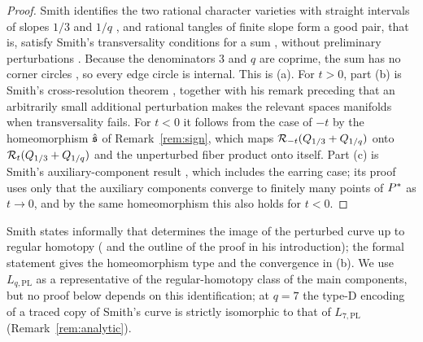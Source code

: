 \begin{proof}
Smith identifies the two rational character varieties with straight intervals of slopes $1/3$ and
$1/q$ \cite[Prop.~2.27]{Smith}, and rational tangles of finite slope form a good pair, that is, satisfy
Smith's transversality conditions for a sum \cite[Def.~3.16]{Smith}, without
preliminary perturbations \cite[example following Thm.~3.26]{Smith}.  Because the denominators $3$ and
$q$ are coprime, the sum has no corner circles \cite[discussion following Prop.~5.8]{Smith}, so every
edge circle is internal.  This is (a).  For $t>0$, part (b) is Smith's cross-resolution theorem
\cite[Thm.~4.22]{Smith}, together with his remark preceding \cite[Thm.~4.20]{Smith} that an
arbitrarily small additional perturbation makes the relevant spaces manifolds when transversality
fails.  For $t<0$ it follows from the case of $-t$ by the homeomorphism $\hat{\mathfrak{s}}$ of
Remark~\ref{rem:sign}, which maps $\mathcal{R}_{-t}(Q_{1/3}+Q_{1/q})$ onto $\mathcal{R}_t(Q_{1/3}+Q_{1/q})$ and the
unperturbed fiber product onto itself.  Part (c) is Smith's auxiliary-component result
\cite[Prop.~5.7]{Smith}, which includes the earring case; its proof uses only that the auxiliary
components converge to finitely many points of $P^{*}$ as $t\to0$, and by the same homeomorphism this
also holds for $t<0$.
\end{proof}

Smith states informally that \cite[Thm.~4.22]{Smith} determines the image of the perturbed curve up
to regular homotopy (\cite[caption of Fig.~3]{Smith} and the outline of the proof in his
introduction); the formal statement gives the homeomorphism type and the convergence in (b).  We use
$L_{q,\mathrm{PL}}$ as a representative of the regular-homotopy class of the main components, but no proof
below depends on
this identification; at $q=7$ the type-D encoding of a traced copy of Smith's curve is strictly
isomorphic to that of $L_{7,\mathrm{PL}}$ (Remark~\ref{rem:analytic}).


